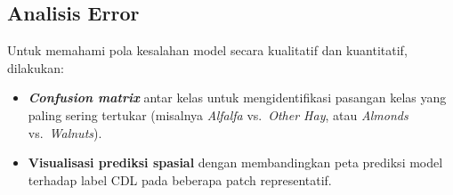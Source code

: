 \subsection{Analisis Error}

Untuk memahami pola kesalahan model secara kualitatif dan kuantitatif, dilakukan:
\begin{itemize}
    \item \textbf{\textit{Confusion matrix}} antar kelas untuk mengidentifikasi pasangan kelas yang paling sering tertukar (misalnya \textit{Alfalfa} vs.\ \textit{Other Hay}, atau \textit{Almonds} vs.\ \textit{Walnuts}).
    \item \textbf{Visualisasi prediksi spasial} dengan membandingkan peta prediksi model terhadap label CDL pada beberapa patch representatif.
\end{itemize}
